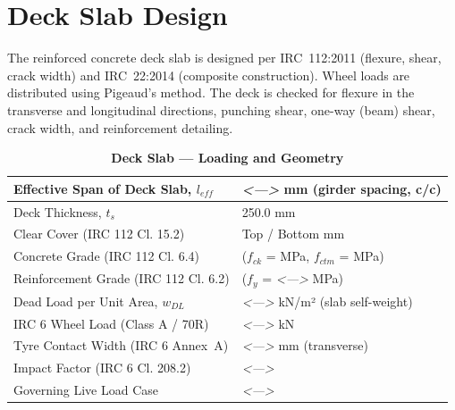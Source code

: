 \documentclass[12pt,a4paper]{report}
\numberwithin{table}{chapter}
\numberwithin{figure}{chapter}
\newcommand{\placeholder}[1]{\textit{\textless #1\textgreater}}
\begin{document}
\section{Deck Slab Design}
\label{sec:deck-design}

The reinforced concrete deck slab is designed per IRC~112:2011 (flexure, shear, crack width) and IRC~22:2014 (composite construction). Wheel loads are distributed using Pigeaud's method. The deck is checked for flexure in the transverse and longitudinal directions, punching shear, one-way (beam) shear, crack width, and reinforcement detailing.

\vspace{1em}
\begin{longtable}{|L{5.5cm}|p{10.0cm}|}
\caption{\textbf{Deck Slab --- Loading and Geometry}}
\hline
\textnormal{Effective Span of Deck Slab, $l_{eff}$} & \placeholder{---} mm (girder spacing, c/c) \\[6pt]
\hline
\textnormal{Deck Thickness, $t_s$} & 250.0 mm \\[6pt]
\hline
\textnormal{Clear Cover (IRC 112 Cl. 15.2)} & Top  / Bottom  mm \\[6pt]
\hline
\textnormal{Concrete Grade (IRC 112 Cl. 6.4)} &  ($f_{ck}$ =  MPa, $f_{ctm}$ =  MPa) \\[6pt]
\hline
\textnormal{Reinforcement Grade (IRC 112 Cl. 6.2)} &  ($f_y$ = \placeholder{---} MPa) \\[6pt]
\hline
\textnormal{Dead Load per Unit Area, $w_{DL}$} & \placeholder{---} kN/m² (slab self-weight) \\[6pt]
\hline
\textnormal{IRC 6 Wheel Load (Class A / 70R)} & \placeholder{---} kN \\[6pt]
\hline
\textnormal{Tyre Contact Width (IRC 6 Annex~A)} & \placeholder{---} mm (transverse) \\[6pt]
\hline
\textnormal{Impact Factor (IRC 6 Cl. 208.2)} & \placeholder{---} \\[6pt]
\hline
\textnormal{Governing Live Load Case} & \placeholder{---} \\[6pt]
\hline
\end{longtable}
\end{document}
